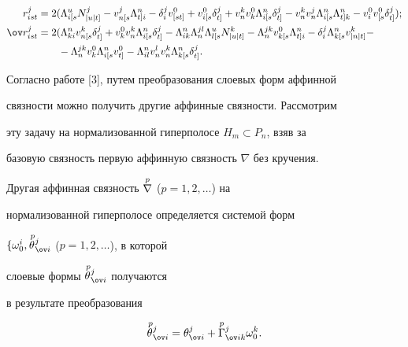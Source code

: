 \begin{align} 


r^j_{is t}&=2(\Lambda^u_{i[s}N^j_{|u|t]}-v^j_{n[s}\Lambda^n_{t]i}- 


\delta^j_iv^0_{[s t]}+v^0_{i[s}\delta^j_{t]}+ 


v^k_n v^0_k\Lambda^n_{i[s}\delta^j_{t]}-v^k_n v^j_n 


\Lambda^n_{i[s}\Lambda^n_{t]k}-v^0_i v^0_{[s}\delta^j_{t]});\\ 


% 


\ov r^j_{is t}&=2(\Lambda^n_{k i}v^k_{n[s}\delta^j_{t]}+ 


v^0_k v^k_n\Lambda^n_{i[s}\delta^j_{t]}-\Lambda^n_{i k} 


\Lambda^{j l}_n\Lambda^u_{l[s}N^k_{|u|t]}-\Lambda^{j k}_n 


v^0_{k[s}\Lambda^n_{t]i}-\delta^j_i\Lambda^n_{k[s}v^k_{|n|t]}- \notag\\


%


&\qquad -\Lambda^{jk}_n v^0_k\Lambda^n_{i[s}v^0_{t]}- 


\Lambda^n_{i l}v^l_n v^k_n\Lambda^n_{k[s}\delta^j_{t]}. 


\end{align} 


 


Согласно работе [3], путем преобразования слоевых форм аффинной 


связности можно получить другие аффинные связности. Рассмотрим 


эту задачу на нормализованной гиперполосе $H_m\subset P_n$, взяв за  


базовую связность первую аффинную связность $\nabla$ без кручения. 


 


Другая аффинная связность $\overset{p}{\nabla}{}$ ($p=1,2,\dotsc$) на 


нормализованной гиперполосе определяется системой форм 


$\{\omega^i_0,\up{\,p}{\theta}^j_{\ov i}$ ($p=1,2,\dotsc$), в которой 


слоевые формы $\up{\,p}{\theta}^j_{\ov i}$ получаются


в результате преобразования


\begin{equation} 


\up{\,p}{\theta}^j_{\ov i}=\theta^j_{\ov i} 


+\up{p}{\Gamma}^j_{\ov i k}\omega^k_0. 


\end{equation} 


